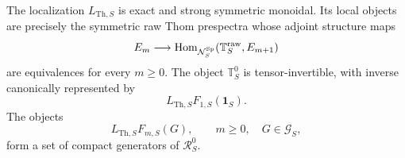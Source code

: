 \begin{theorem}
\label{thm:infinitesimal-raw-thom-stabilization}
The localization \(L_{\mathrm{Th},S}\) is exact and strong symmetric monoidal.
Its local objects are precisely the symmetric raw Thom prespectra whose adjoint
structure maps
\[
  E_m
  \longrightarrow
  \operatorname{Hom}_{\mathcal N_S^{\mathrm{Sp}}}
  (\mathbb T_S^{\mathrm{raw}},E_{m+1})
\]
are equivalences for every \(m\geq0\).  The object
\(\mathbb T_S^0\) is tensor-invertible, with inverse canonically represented by
\[
  L_{\mathrm{Th},S}F_{1,S}(\mathbf1_S).
\]
The objects
\[
  L_{\mathrm{Th},S}F_{m,S}(G),
  \qquad m\geq0,
  \quad G\in\mathcal G_S,
\]
form a set of compact generators of \(\mathcal R_S^0\).
\end{theorem}

